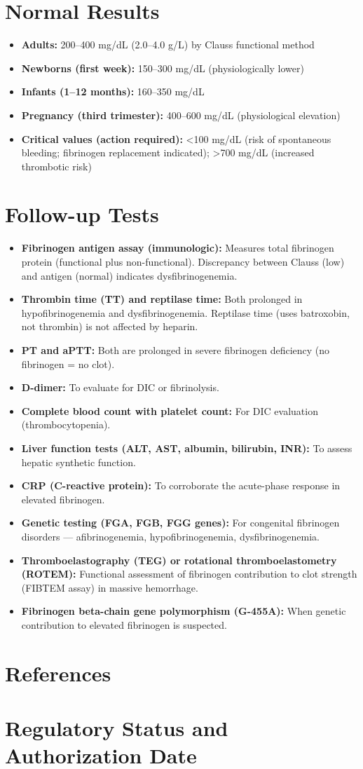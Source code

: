 \section*{Normal Results}
\begin{itemize}
  \item \textbf{Adults:} 200--400 mg/dL (2.0--4.0 g/L) by Clauss functional method
  \item \textbf{Newborns (first week):} 150--300 mg/dL (physiologically lower)
  \item \textbf{Infants (1--12 months):} 160--350 mg/dL
  \item \textbf{Pregnancy (third trimester):} 400--600 mg/dL (physiological elevation)
  \item \textbf{Critical values (action required):} <100 mg/dL (risk of spontaneous bleeding; fibrinogen replacement indicated); >700 mg/dL (increased thrombotic risk) \cite{wallach2022interpretation}
\end{itemize}

\section*{Follow-up Tests}
\begin{itemize}
  \item \textbf{Fibrinogen antigen assay (immunologic):} Measures total fibrinogen protein (functional plus non-functional). Discrepancy between Clauss (low) and antigen (normal) indicates dysfibrinogenemia.
  \item \textbf{Thrombin time (TT) and reptilase time:} Both prolonged in hypofibrinogenemia and dysfibrinogenemia. Reptilase time (uses batroxobin, not thrombin) is not affected by heparin.
  \item \textbf{PT and aPTT:} Both are prolonged in severe fibrinogen deficiency (no fibrinogen = no clot).
  \item \textbf{D-dimer:} To evaluate for DIC or fibrinolysis.
  \item \textbf{Complete blood count with platelet count:} For DIC evaluation (thrombocytopenia).
  \item \textbf{Liver function tests (ALT, AST, albumin, bilirubin, INR):} To assess hepatic synthetic function.
  \item \textbf{CRP (C-reactive protein):} To corroborate the acute-phase response in elevated fibrinogen.
  \item \textbf{Genetic testing (FGA, FGB, FGG genes):} For congenital fibrinogen disorders --- afibrinogenemia, hypofibrinogenemia, dysfibrinogenemia.
  \item \textbf{Thromboelastography (TEG) or rotational thromboelastometry (ROTEM):} Functional assessment of fibrinogen contribution to clot strength (FIBTEM assay) in massive hemorrhage.
  \item \textbf{Fibrinogen beta-chain gene polymorphism (G-455A):} When genetic contribution to elevated fibrinogen is suspected.
\end{itemize}

\section*{References}



\clearpage
\section*{Regulatory Status and Authorization Date}

\clearpage
